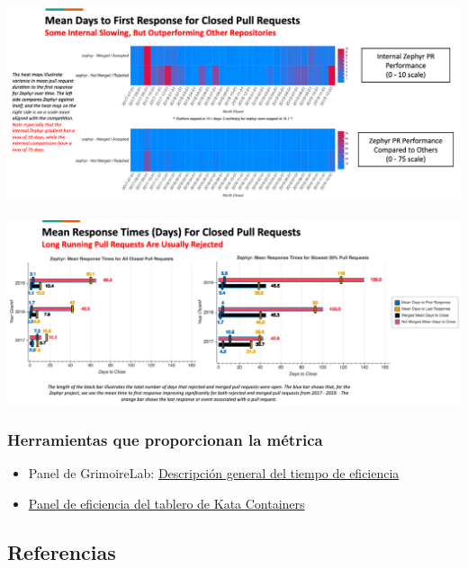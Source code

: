 \hypertarget{visualizaciuxf3n-de-augur-mapa-de-calor-de-tiempo-hasta-la-primera-respuesta}{%
\subsection{\texorpdfstring{\protect\includegraphics{images/time-to-first-response_augur-ttc-1.png}}{Visualización de Augur: mapa de calor de tiempo hasta la primera respuesta}}\label{visualizaciuxf3n-de-augur-mapa-de-calor-de-tiempo-hasta-la-primera-respuesta}}

\includegraphics{images/time-to-first-response_augur-ttc-2.png}

\hypertarget{herramientas-que-proporcionan-la-muxe9trica}{%
\subsubsection{Herramientas que proporcionan la
métrica}\label{herramientas-que-proporcionan-la-muxe9trica}}

\begin{itemize}
\tightlist
\item
  Panel de GrimoireLab:
  \href{https://chaoss.github.io/grimoirelab-sigils/panels/efficiency-timing-overview/}{Descripción
  general del tiempo de eficiencia}
\item
  \href{https://katacontainers.biterg.io/app/kibana\#/dashboard/cbbdd920-288c-11e9-b662-975152e57997}{Panel
  de eficiencia del tablero de Kata Containers}
\end{itemize}

\hypertarget{referencias}{%
\subsection{Referencias}\label{referencias}}
